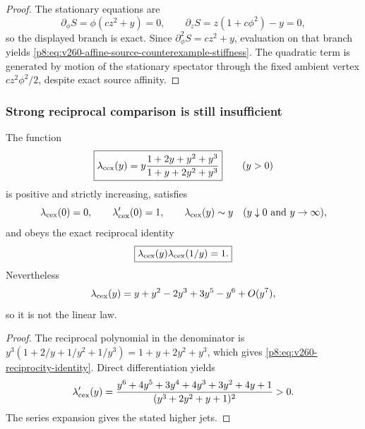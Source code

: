 \documentclass[12pt,a4paper]{article}
\begin{document}
\begin{proof}
The stationary equations are
\[
 \partial_\phi S=\phi(cz^2+y)=0,
 \qquad
 \partial_zS=z(1+c\phi^2)-y=0,
\]
so the displayed branch is exact.  Since
\(
\partial_\phi^2S=cz^2+y
\), evaluation on that branch yields
\eqref{p8:eq:v260-affine-source-counterexample-stiffness}.  The quadratic
term is generated by motion of the stationary spectator through the fixed
ambient vertex \(cz^2\phi^2/2\), despite exact source affinity.
\end{proof}

\subsubsection{Strong reciprocal comparison is still insufficient}
\begin{proposition}
\label{p8:prop:v260-reciprocity-counterexample}
The function
\begin{equation}
 \label{p8:eq:v260-reciprocity-counterexample}
 \boxed{
 \lambda_{\rm cex}(y)
 =y\frac{1+2y+y^2+y^3}{1+y+2y^2+y^3}}
 \qquad(y>0)
\end{equation}
is positive and strictly increasing, satisfies
\[
 \lambda_{\rm cex}(0)=0,
 \qquad
 \lambda_{\rm cex}'(0)=1,
 \qquad
 \lambda_{\rm cex}(y)\sim y
 \quad(y\downarrow0\text{ and }y\to\infty),
\]
and obeys the exact reciprocal identity
\begin{equation}
 \label{p8:eq:v260-reciprocity-identity}
 \boxed{\lambda_{\rm cex}(y)\lambda_{\rm cex}(1/y)=1.}
\end{equation}
Nevertheless
\[
 \lambda_{\rm cex}(y)
 =y+y^2-2y^3+3y^5-y^6+O(y^7),
\]
so it is not the linear law.
\end{proposition}

\begin{proof}
The reciprocal polynomial in the denominator is
\(y^3(1+2/y+1/y^2+1/y^3)=1+y+2y^2+y^3\), which gives
\eqref{p8:eq:v260-reciprocity-identity}.  Direct differentiation yields
\[
 \lambda_{\rm cex}'(y)
 =\frac{y^6+4y^5+3y^4+4y^3+3y^2+4y+1}
 {(y^3+2y^2+y+1)^2}>0.
\]
The series expansion gives the stated higher jets.
\end{proof}

\end{document}
